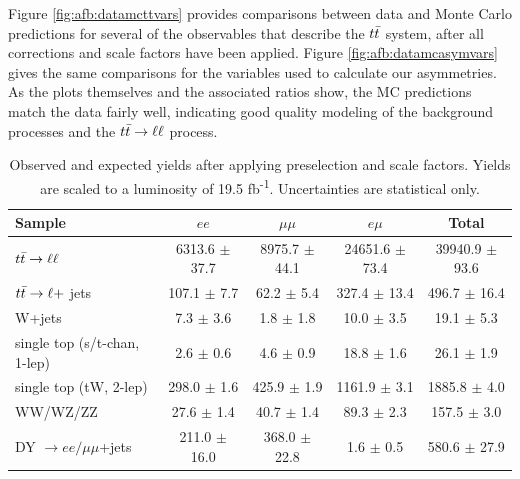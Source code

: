 Figure \ref{fig:afb:datamcttvars} provides comparisons between data
and Monte Carlo predictions for several of the observables
that describe the $t\bar{t}$ system, after all corrections and scale
factors have been applied. Figure \ref{fig:afb:datamcasymvars} gives
the same comparisons for the variables used to calculate our asymmetries.
As the plots themselves and the associated
ratios show, the MC predictions match the data fairly well, indicating
good quality modeling of the background processes and the
$t\bar{t} \rightarrow \ell\ell$ process.

\begin{table}[hbt]
\begin{center}
\caption{Observed and expected yields after applying preselection and scale
  factors. Yields are scaled to a luminosity of 19.5
  fb\textsuperscript{-1}. Uncertainties are statistical only.}
\label{tab:afb:datamcyields}
\begin{tabular}{l |  c  c  c  c}
\hline
                                        Sample   &                $ee$   &            $\mu\mu$   &              $e\mu$   &               Total  \\
\hline
                 $t\bar{t} \rightarrow \ell\ell$   &   6313.6 $\pm$ 37.7   &   8975.7 $\pm$ 44.1   &  24651.6 $\pm$ 73.4   &  39940.9 $\pm$ 93.6  \\
              $t\bar{t} \rightarrow \ell +$ jets   &     107.1 $\pm$ 7.7   &      62.2 $\pm$ 5.4   &    327.4 $\pm$ 13.4   &    496.7 $\pm$ 16.4  \\
                                        W+jets   &       7.3 $\pm$ 3.6   &       1.8 $\pm$ 1.8   &      10.0 $\pm$ 3.5   &      19.1 $\pm$ 5.3  \\
                  single top (s/t-chan, 1-lep)   &       2.6 $\pm$ 0.6   &       4.6 $\pm$ 0.9   &      18.8 $\pm$ 1.6   &      26.1 $\pm$ 1.9  \\
                        single top (tW, 2-lep)   &     298.0 $\pm$ 1.6   &     425.9 $\pm$ 1.9   &    1161.9 $\pm$ 3.1   &    1885.8 $\pm$ 4.0  \\
                                      WW/WZ/ZZ   &      27.6 $\pm$ 1.4   &      40.7 $\pm$ 1.4   &      89.3 $\pm$ 2.3   &     157.5 $\pm$ 3.0  \\
               DY $\rightarrow ee/\mu\mu$+jets   &    211.0 $\pm$ 16.0   &    368.0 $\pm$ 22.8   &       1.6 $\pm$ 0.5   &    580.6 $\pm$ 27.9  \\

\end{tabular}
\end{center}
\end{table}
